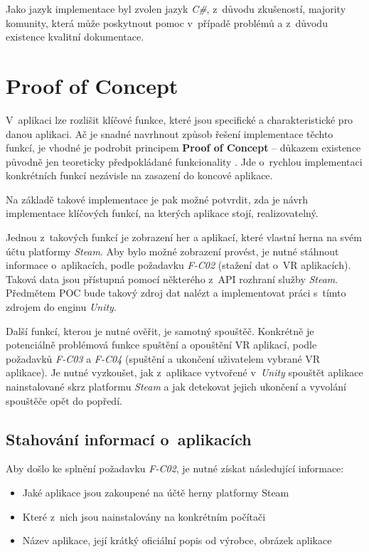 Jako jazyk implementace byl zvolen jazyk \emph{C\#}, z~důvodu zkušeností, majority komunity, která může poskytnout pomoc
v~případě problémů a z~důvodu existence kvalitní dokumentace.

\section{Proof of Concept}\label{proof-of-concept}

V~aplikaci lze rozlišit klíčové funkce, které jsou specifické a
charakteristické pro danou aplikaci. Ač je snadné navrhnout způsob
řešení implementace těchto funkcí, je vhodné je podrobit
principem \textbf{Proof of Concept} -- důkazem existence původně jen
teoreticky předpokládané funkcionality \autocite{proofofconcept}. Jde o~rychlou implementaci
konkrétních funkcí nezávisle na zasazení do koncové aplikace.

Na základě takové implementace je pak možné potvrdit, zda je návrh
implementace klíčových funkcí, na kterých aplikace stojí,
realizovatelný.

Jednou z~takových funkcí je zobrazení her a aplikací, které vlastní herna na svém
účtu platformy \emph{Steam}. Aby bylo možné zobrazení provést, je nutné
stáhnout informace o~aplikacích, podle požadavku \emph{F-C02} (stažení dat
o~VR aplikacích). Taková data jsou přístupná pomocí některého z~API
rozhraní služby \emph{Steam}. Předmětem POC bude takový zdroj dat nalézt
a implementovat práci s~tímto zdrojem do enginu \emph{Unity}.

Další funkcí, kterou je nutné ověřit, je samotný spouštěč. Konkrétně
je potenciálně problémová funkce spuštění a opouštění VR aplikací, podle
požadavků \emph{F-C03} a \emph{F-C04} (spuštění a ukončení uživatelem
vybrané VR aplikace). Je nutné vyzkoušet, jak z~aplikace vytvořené
v~\emph{Unity} spouštět aplikace nainstalované skrz platformu \emph{Steam}
a jak detekovat jejich ukončení a vyvolání spouštěče opět do popředí.

\subsection{Stahování informací
o~aplikacích}\label{stahovuxe1nuxed-informacuxed-o-aplikacuxedch}

Aby došlo ke splnění požadavku \emph{F-C02}, je nutné získat následující
informace:

\begin{itemize}
\tightlist
\item
  Jaké aplikace jsou zakoupené na účtě herny platformy Steam
\item
  Které z~nich jsou nainstalovány na konkrétním počítači
\item
  Název aplikace, její krátký oficiální popis od výrobce, obrázek
  aplikace
\end{itemize}

